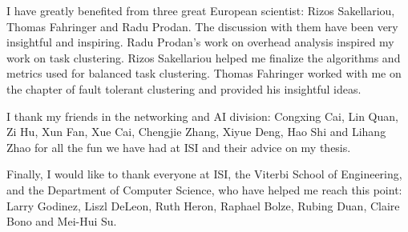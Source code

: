 I have greatly benefited from three great European scientist: Rizos Sakellariou, Thomas Fahringer and Radu Prodan. The discussion with them have been very insightful and inspiring. Radu Prodan's work on overhead analysis inspired my work on task clustering. Rizos Sakellariou helped me finalize the algorithms and metrics used for balanced task clustering. Thomas Fahringer worked with me on the chapter of fault tolerant clustering and provided his insightful ideas. 

I thank my friends in the networking and AI division: Congxing Cai, Lin Quan, Zi Hu, Xun Fan, Xue Cai, Chengjie Zhang, Xiyue Deng, Hao Shi and Lihang Zhao for all the fun we have had at ISI and their advice on my thesis. 

Finally, I would like to thank everyone at ISI, the Viterbi School of Engineering, and the Department of Computer Science, who have helped me reach this point: Larry Godinez, Liszl DeLeon, Ruth Heron, Raphael Bolze, Rubing Duan, Claire Bono and Mei-Hui Su. 

